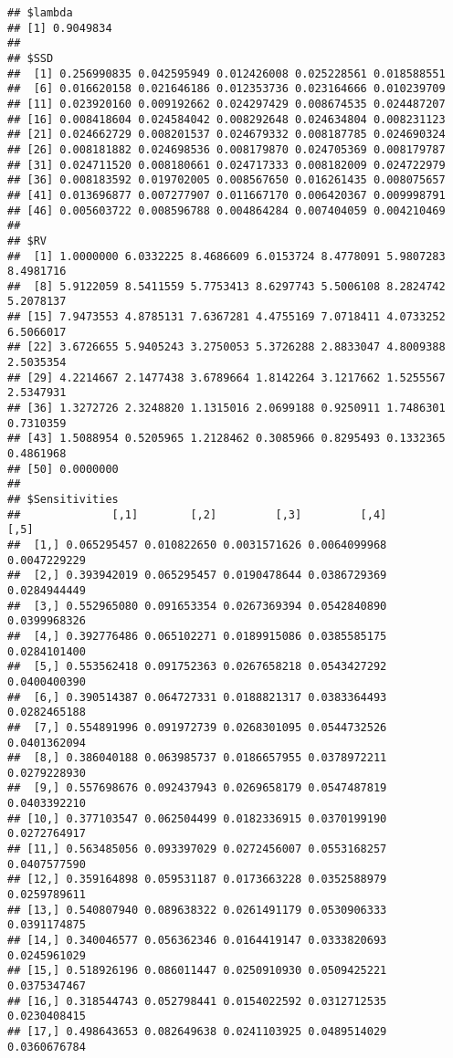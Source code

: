 \documentclass[]{article}
\begin{document}
\begin{verbatim}
## $lambda
## [1] 0.9049834
## 
## $SSD
##  [1] 0.256990835 0.042595949 0.012426008 0.025228561 0.018588551
##  [6] 0.016620158 0.021646186 0.012353736 0.023164666 0.010239709
## [11] 0.023920160 0.009192662 0.024297429 0.008674535 0.024487207
## [16] 0.008418604 0.024584042 0.008292648 0.024634804 0.008231123
## [21] 0.024662729 0.008201537 0.024679332 0.008187785 0.024690324
## [26] 0.008181882 0.024698536 0.008179870 0.024705369 0.008179787
## [31] 0.024711520 0.008180661 0.024717333 0.008182009 0.024722979
## [36] 0.008183592 0.019702005 0.008567650 0.016261435 0.008075657
## [41] 0.013696877 0.007277907 0.011667170 0.006420367 0.009998791
## [46] 0.005603722 0.008596788 0.004864284 0.007404059 0.004210469
## 
## $RV
##  [1] 1.0000000 6.0332225 8.4686609 6.0153724 8.4778091 5.9807283 8.4981716
##  [8] 5.9122059 8.5411559 5.7753413 8.6297743 5.5006108 8.2824742 5.2078137
## [15] 7.9473553 4.8785131 7.6367281 4.4755169 7.0718411 4.0733252 6.5066017
## [22] 3.6726655 5.9405243 3.2750053 5.3726288 2.8833047 4.8009388 2.5035354
## [29] 4.2214667 2.1477438 3.6789664 1.8142264 3.1217662 1.5255567 2.5347931
## [36] 1.3272726 2.3248820 1.1315016 2.0699188 0.9250911 1.7486301 0.7310359
## [43] 1.5088954 0.5205965 1.2128462 0.3085966 0.8295493 0.1332365 0.4861968
## [50] 0.0000000
## 
## $Sensitivities
##              [,1]        [,2]         [,3]         [,4]         [,5]
##  [1,] 0.065295457 0.010822650 0.0031571626 0.0064099968 0.0047229229
##  [2,] 0.393942019 0.065295457 0.0190478644 0.0386729369 0.0284944449
##  [3,] 0.552965080 0.091653354 0.0267369394 0.0542840890 0.0399968326
##  [4,] 0.392776486 0.065102271 0.0189915086 0.0385585175 0.0284101400
##  [5,] 0.553562418 0.091752363 0.0267658218 0.0543427292 0.0400400390
##  [6,] 0.390514387 0.064727331 0.0188821317 0.0383364493 0.0282465188
##  [7,] 0.554891996 0.091972739 0.0268301095 0.0544732526 0.0401362094
##  [8,] 0.386040188 0.063985737 0.0186657955 0.0378972211 0.0279228930
##  [9,] 0.557698676 0.092437943 0.0269658179 0.0547487819 0.0403392210
## [10,] 0.377103547 0.062504499 0.0182336915 0.0370199190 0.0272764917
## [11,] 0.563485056 0.093397029 0.0272456007 0.0553168257 0.0407577590
## [12,] 0.359164898 0.059531187 0.0173663228 0.0352588979 0.0259789611
## [13,] 0.540807940 0.089638322 0.0261491179 0.0530906333 0.0391174875
## [14,] 0.340046577 0.056362346 0.0164419147 0.0333820693 0.0245961029
## [15,] 0.518926196 0.086011447 0.0250910930 0.0509425221 0.0375347467
## [16,] 0.318544743 0.052798441 0.0154022592 0.0312712535 0.0230408415
## [17,] 0.498643653 0.082649638 0.0241103925 0.0489514029 0.0360676784

\end{verbatim}
\end{document}
